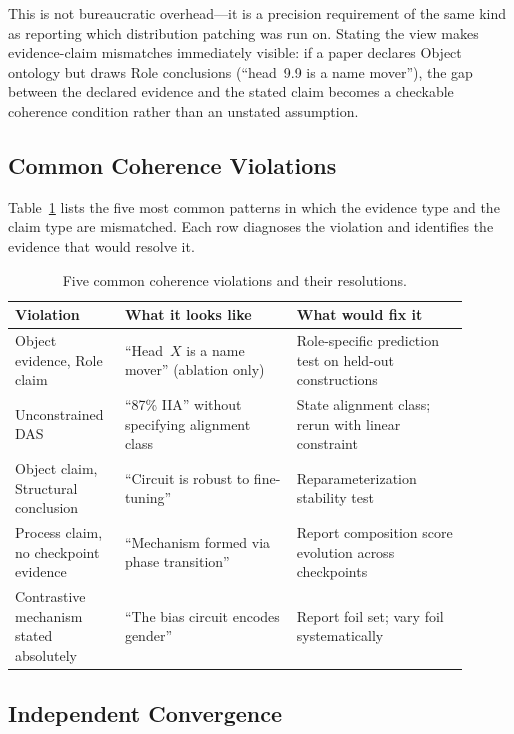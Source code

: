 \documentclass{article}
\begin{document}
This is not bureaucratic overhead---it is a precision requirement of
the same kind as reporting which distribution patching was run on.
Stating the view makes evidence-claim mismatches immediately visible:
if a paper declares Object ontology but draws Role conclusions
(``head~9.9 is a name mover''), the gap between the declared evidence
and the stated claim becomes a checkable coherence condition rather
than an unstated assumption.

\subsection{Common Coherence Violations}

Table~\ref{tab:violations} lists the five most common patterns
in which the evidence type and the claim type are mismatched.
Each row diagnoses the violation and identifies the evidence that
would resolve it.

\begin{table}[H]
\centering
\small
\begin{tabular}{p{0.20\linewidth}p{0.35\linewidth}p{0.35\linewidth}}
\toprule
\textbf{Violation} & \textbf{What it looks like} & \textbf{What would fix it} \\
\midrule
Object evidence, Role claim
  & ``Head~$X$ is a name mover'' (ablation only)
  & Role-specific prediction test on held-out constructions \\[4pt]
Unconstrained DAS
  & ``87\% IIA'' without specifying alignment class
  & State alignment class; rerun with linear constraint \citep{sutter2025} \\[4pt]
Object claim, Structural conclusion
  & ``Circuit is robust to fine-tuning''
  & Reparameterization stability test \\[4pt]
Process claim, no checkpoint evidence
  & ``Mechanism formed via phase transition''
  & Report composition score evolution across checkpoints \\[4pt]
Contrastive mechanism stated absolutely
  & ``The bias circuit encodes gender''
  & Report foil set; vary foil systematically \\
\bottomrule
\end{tabular}
\caption{Five common coherence violations and their resolutions.}
\label{tab:violations}
\end{table}

\subsection{Independent Convergence}
\end{document}
